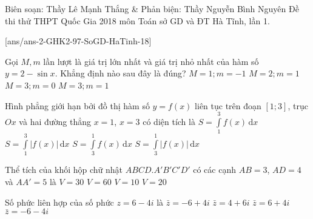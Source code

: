\begin{name}
{Biên soạn: Thầy Lê Mạnh Thắng \& Phản biện: Thầy Nguyễn Bình Nguyên}
{Đề thi thử THPT Quốc Gia 2018 môn Toán sở GD và ĐT Hà Tĩnh, lần 1.}
\end{name}
\setcounter{ex}{0}\setcounter{bt}{0}
[ans/ans-2-GHK2-97-SoGD-HaTinh-18]
\begin{ex}%
	Gọi $M,m$ lần lượt là giá trị lớn nhất và giá trị nhỏ nhất của hàm số $y=2-\sin{x}$. Khẳng định nào sau đây là đúng?
	\choice
	{$M=1;m=-1$}
	{$M=2;m=1$}
	{$M=3;m=0$}
	{\True $M=3;m=1$}
\end{ex}
\begin{ex}%
	Hình phẳng giới hạn bởi đồ thị hàm số $y=f(x)$ liên tục trên đoạn $\left[1;3\right]$, trục $Ox$ và hai đường thẳng $x=1$, $x=3$ có diện tích là
	\choice
	{$S=\displaystyle\int\limits_{1}^{3} f(x)\mathrm{\,d}x$}
	{\True $S=\displaystyle\int\limits_{1}^{3} \left|f(x)\right|\mathrm{\,d}x$}
	{$S=\displaystyle\int\limits_{3}^{1} f(x)\mathrm{\,d}x$}
	{$S=\displaystyle\int\limits_{3}^{1} \left|f(x)\right|\mathrm{\,d}x$}
\end{ex}
\begin{ex}%
	Thể tích của khối hộp chữ nhật $ABCD.A'B'C'D'$ có các cạnh $AB=3$, $AD=4$ và $AA'=5$ là
	\choice
	{$V=30$}
	{\True $V=60$}
	{$V=10$}
	{$V=20$}
\end{ex}
\begin{ex}%
	Số phức liên hợp của số phức $z=6-4i$ là
	\choice
	{$\bar{z}=-6+4i$}
	{$\bar{z}=4+6i$}
	{\True $\bar{z}=6+4i$}
	{$\bar{z}=-6-4i$}
\end{ex}

